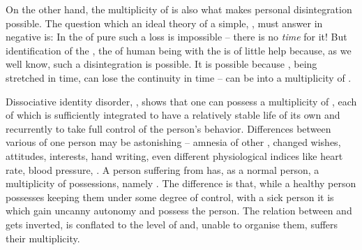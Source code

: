 
\pa\label{pa:egoDID} On the other hand, the multiplicity of  is also
what makes personal disintegration possible.  The question which an ideal theory
of a simple, ,   must answer in
negative is:   In the  of pure
 such a loss is impossible -- there is no {\em time} for it!
But identification of the , the  of human being with the
 is of little help because, as we well know, such a
disintegration is possible. It is possible because , being stretched in
time, can lose the continuity in time --  can be  into a
multiplicity of .

Dissociative identity disorder, , shows that one can possess a multiplicity
of , each of which is sufficiently integrated to have a relatively
stable life of its own and recurrently to take full control of the person's
behavior.  Differences between various
 of one person may be astonishing -- amnesia of other ,
changed wishes, attitudes, interests, hand writing, even different physiological
indices like heart rate, blood pressure, .
%
A person suffering from  has, as a normal person, a multiplicity of
possessions, namely . The difference is that, while a healthy person
possesses  keeping them under some degree of control, with a sick
person it is  which gain uncanny autonomy and possess the person. The
relation between  and  gets inverted,  is conflated to
the level of  and, unable to organise them, suffers their multiplicity.

